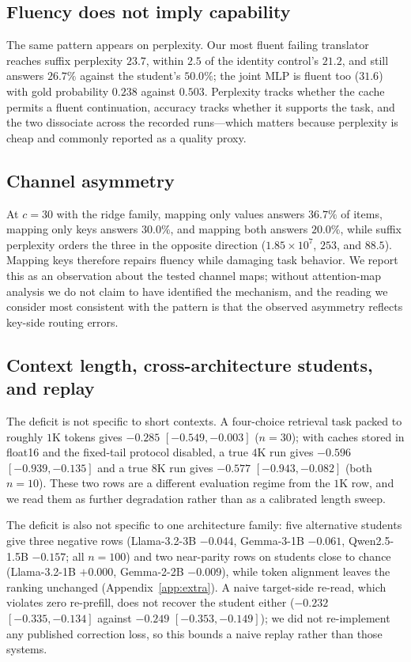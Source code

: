 \documentclass[10pt]{article}
\begin{document}
\subsection{Fluency does not imply capability}
The same pattern appears on perplexity. Our most fluent failing translator
reaches suffix perplexity $23.7$, within $2.5$ of the identity control's $21.2$,
and still answers $26.7\%$ against the student's $50.0\%$; the joint MLP is
fluent too ($31.6$) with gold probability $0.238$ against $0.503$. Perplexity
tracks whether the cache permits a fluent continuation, accuracy tracks whether
it supports the task, and the two dissociate across the recorded runs---which
matters because perplexity is cheap and commonly reported as a quality proxy.

\subsection{Channel asymmetry}
At $c{=}30$ with the ridge family, mapping only values answers $36.7\%$ of
items, mapping only keys answers $30.0\%$, and mapping both answers $20.0\%$,
while suffix perplexity orders the three in the opposite direction
($1.85\times10^{7}$, $253$, and $88.5$). Mapping keys therefore repairs fluency
while damaging task behavior. We report this as an observation about the tested
channel maps; without attention-map analysis we do not claim to have identified
the mechanism, and the reading we consider most consistent with the pattern is
that the observed asymmetry reflects key-side routing errors.

\subsection{Context length, cross-architecture students, and replay}
The deficit is not specific to short contexts. A four-choice retrieval task
packed to roughly $1$K tokens gives $-0.285$ $[-0.549,-0.003]$ ($n{=}30$);
with caches stored in float16 and the fixed-tail protocol disabled, a true
$4$K run gives $-0.596$ $[-0.939,-0.135]$ and a true $8$K run gives $-0.577$
$[-0.943,-0.082]$ (both $n{=}10$). These two rows are a different evaluation
regime from the $1$K row, and we read them as further degradation rather than as
a calibrated length sweep.

The deficit is also not specific to one architecture family: five alternative
students give three negative rows (Llama-3.2-3B $-0.044$, Gemma-3-1B $-0.061$,
Qwen2.5-1.5B $-0.157$; all $n{=}100$) and two near-parity rows on students
close to chance (Llama-3.2-1B $+0.000$, Gemma-2-2B $-0.009$), while token
alignment leaves the ranking unchanged (Appendix~\ref{app:extra}). A naive
target-side re-read, which violates zero re-prefill, does not recover the
student either ($-0.232$ $[-0.335,-0.134]$ against $-0.249$ $[-0.353,-0.149]$);
we did not re-implement any published correction loss, so this bounds a naive
replay rather than those systems.
\end{document}
